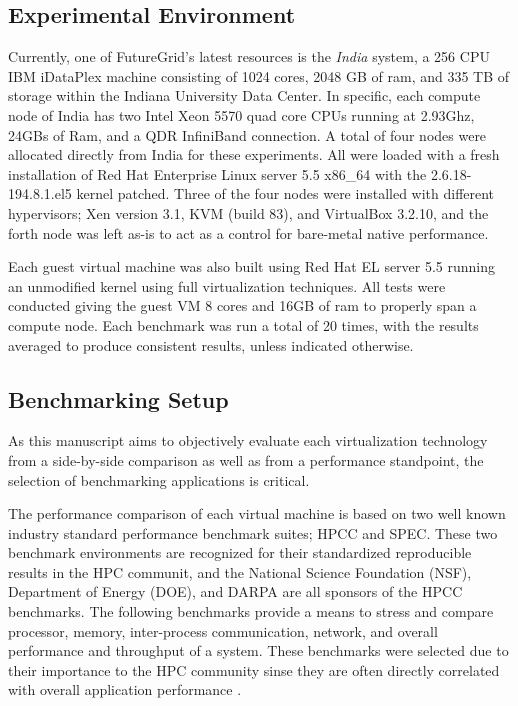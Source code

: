 \subsection{Experimental Environment}

Currently, one of FutureGrid's latest resources is the {\it India} system, a 256 CPU IBM iDataPlex machine consisting of 1024 cores, 2048 GB of ram, and 335 TB of storage within the Indiana University Data Center.  In specific, each compute node of India has two Intel Xeon 5570 quad core CPUs running at 2.93Ghz, 24GBs of Ram, and a QDR InfiniBand connection.  A total of four nodes were allocated directly from India for these experiments.  All were loaded with a fresh installation of Red Hat Enterprise Linux server 5.5 x86\_64 with the 2.6.18-194.8.1.el5 kernel patched. Three of the four nodes were installed with different hypervisors; Xen version 3.1, KVM (build 83), and VirtualBox 3.2.10, and the forth node was left as-is to act as a control for bare-metal native performance.  

Each guest virtual machine was also built using Red Hat EL server 5.5 running an unmodified kernel using full virtualization techniques.  All tests were conducted giving the guest VM 8 cores and 16GB of ram to properly span a compute node.  Each benchmark was run a total of 20 times, with the results averaged to produce consistent results, unless indicated otherwise.


\subsection{Benchmarking Setup}

As this manuscript aims to objectively evaluate each virtualization technology from a side-by-side comparison as well as from a performance standpoint, the selection of benchmarking applications is critical.  

The performance comparison of each virtual machine is based on two well known industry standard performance benchmark suites; HPCC and  SPEC. These two benchmark environments are recognized for their standardized reproducible results in the HPC communit, and the National Science Foundation (NSF), Department of Energy (DOE), and DARPA are all sponsors of the HPCC benchmarks. The following benchmarks provide a means to stress and compare processor, memory, inter-process communication, network, and overall performance and throughput of a system.  These benchmarks were selected due to their importance to the HPC community sinse they are often directly correlated with overall application performance \cite{Dujmovic1998}. 
 



